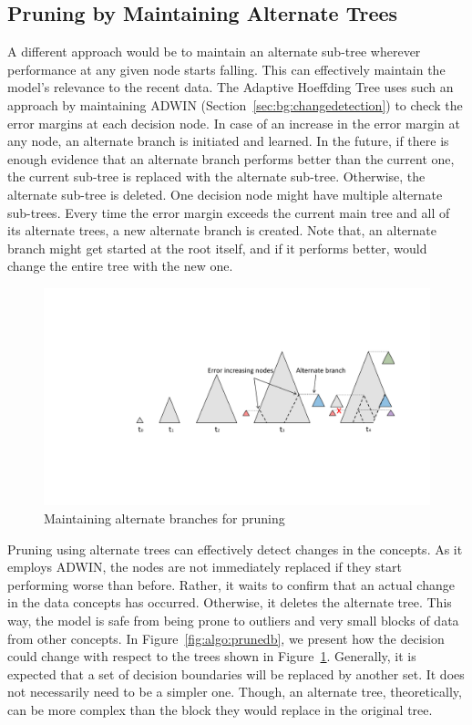 \subsection{Pruning by Maintaining Alternate Trees}
A different approach would be to maintain an alternate sub-tree wherever performance at any given node starts falling. This can effectively maintain the model's relevance to the recent data. The Adaptive Hoeffding Tree uses such an approach by maintaining ADWIN (Section~\ref{sec:bg:changedetection}) to check the error margins at each decision node. In case of an increase in the error margin at any node, an alternate branch is initiated and learned. In the future, if there is enough evidence that an alternate branch performs better than the current one, the current sub-tree is replaced with the alternate sub-tree. Otherwise, the alternate sub-tree is deleted. One decision node might have multiple alternate sub-trees. Every time the error margin exceeds the current main tree and all of its alternate trees, a new alternate branch is created. Note that, an alternate branch might get started at the root itself, and if it performs better, would change the entire tree with the new one.

\begin{figure}[htbp]
    \begin{center}
        \includegraphics[width=14.0cm]{figs/prune.pdf}
        \caption{Maintaining alternate branches for pruning}
        \label{fig:algo:prune}
    \end{center}
\end{figure}

Pruning using alternate trees can effectively detect changes in the concepts. As it employs ADWIN, the nodes are not immediately replaced if they start performing worse than before. Rather, it waits to confirm that an actual change in the data concepts has occurred. Otherwise, it deletes the alternate tree. This way, the model is safe from being prone to outliers and very small blocks of data from other concepts. In Figure~\ref{fig:algo:prunedb}, we present how the decision could change with respect to the trees shown in Figure~\ref{fig:algo:prune}. Generally, it is expected that a set of decision boundaries will be replaced by another set. It does not necessarily need to be a simpler one. Though, an alternate tree, theoretically, can be more complex than the block they would replace in the original tree.

